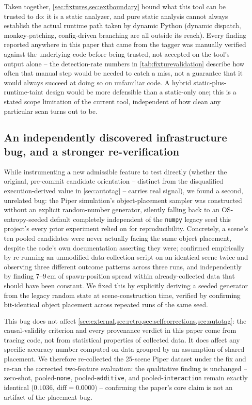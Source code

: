 \documentclass[journal]{IEEEtran}
\begin{document}
Taken together, \cref{sec:fixtures,sec:extboundary} bound what this tool
can be trusted to do: it is a static analyzer, and pure static analysis
cannot always establish the actual runtime path taken by dynamic Python
(dynamic dispatch, monkey-patching, config-driven branching are all
outside its reach). Every finding reported anywhere in this paper that
came from the tagger was manually verified against the underlying code
before being trusted, not accepted on the tool's output alone -- the
detection-rate numbers in \cref{tab:fixturevalidation} describe how often
that manual step would be needed to catch a miss, not a guarantee that it
would always succeed at doing so on unfamiliar code. A hybrid
static-plus-runtime-taint design would be more defensible than a
static-only one; this is a stated scope limitation of the current tool,
independent of how clean any particular scan turns out to be.

\subsection{An independently discovered infrastructure bug, and a stronger re-verification}
\label{sec:rngbug}

While instrumenting a new admissible feature to test directly (whether the
original, pre-commit candidate orientation -- distinct from the
disqualified execution-derived value in \cref{sec:autotag} -- carries
real signal), we found a second, unrelated bug: the Piper simulation's
object-placement sampler was constructed without an explicit random-number
generator, silently falling back to an OS-entropy-seeded default
completely independent of the \texttt{numpy} legacy seed this project's
every prior experiment relied on for reproducibility. Concretely, a
scene's ten pooled candidates were never actually facing the same object
placement, despite the code's own documentation asserting they were;
confirmed empirically by re-running an unmodified data-collection script
on an identical scene twice and observing three different outcome
patterns across three runs, and independently by finding 7--9\,cm of
spawn-position spread within already-collected data that should have been
constant. We fixed this by explicitly deriving a seeded generator from the
legacy random state at scene-construction time, verified by confirming
bit-identical object placement across repeated runs of the same seed.

This bug does not affect \cref{sec:external,sec:retro,sec:selfcorrections,sec:autotag}: the causal-validity criterion and every
provenance verdict in this paper come from tracing code, not from
statistical properties of collected data. It does affect any specific
accuracy number computed on data grouped by an assumption of shared
placement. We therefore re-collected the 25-scene Piper dataset under the
fix and re-ran the corrected two-feature evaluation: the qualitative
finding is unchanged -- zero-shot, pooled-\texttt{none},
pooled-\texttt{additive}, and pooled-\texttt{interaction} remain exactly
identical ($0.1036$, $\mathrm{diff}=0.0000$) -- confirming the paper's
core claim is not an artifact of the placement bug.
\end{document}

